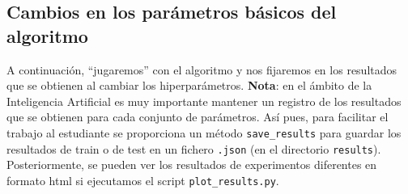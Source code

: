 \documentclass{article}
\begin{document}

\subsection{Cambios en los parámetros básicos del algoritmo}
A continuación, ``jugaremos'' con el algoritmo y nos fijaremos en los resultados que se obtienen al cambiar los hiperparámetros. \textbf{Nota}: en el ámbito de la Inteligencia Artificial es muy importante mantener un registro de los resultados que se obtienen para cada conjunto de parámetros. Así pues, para facilitar el trabajo al estudiante se proporciona un método \texttt{save\_results} para guardar los resultados de train o de test en un fichero \texttt{.json} (en el directorio \texttt{results}). Posteriormente, se pueden ver los resultados de experimentos diferentes en formato html si ejecutamos el script \texttt{plot\_results.py}.
\end{document}
